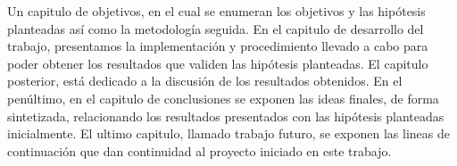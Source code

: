 \newpage

Un capitulo de objetivos, en el cual se enumeran los objetivos y las hipótesis planteadas así como la metodología seguida. En el capitulo de desarrollo del trabajo, presentamos la implementación y procedimiento llevado a cabo para poder obtener los resultados que validen las hipótesis planteadas. El capitulo posterior, está dedicado a la discusión de los resultados obtenidos. En el penúltimo, en el capitulo de conclusiones se exponen las ideas finales, de forma sintetizada, relacionando los resultados presentados con las hipótesis planteadas inicialmente. El ultimo capitulo, llamado trabajo futuro, se exponen las lineas de continuación que dan continuidad al proyecto iniciado en este trabajo.

